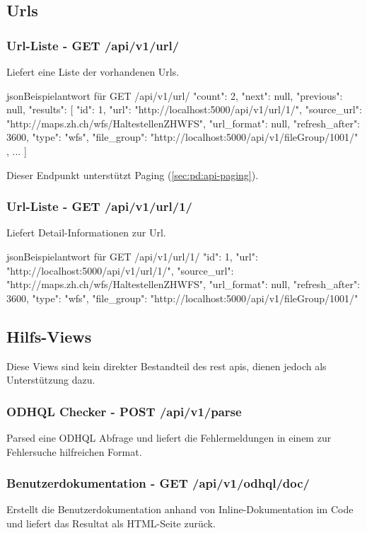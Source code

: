 \subsection{Urls} \label{sec:pd:api-urls}
\subsubsection{Url-Liste - GET /api/v1/url/}
Liefert eine Liste der vorhandenen Urls.

\begin{srclst}{json}{Beispielantwort für GET /api/v1/url/}
{
    "count": 2, 
    "next": null, 
    "previous": null, 
    "results": [
        {
            "id": 1, 
            "url": "http://localhost:5000/api/v1/url/1/", 
            "source_url": "http://maps.zh.ch/wfs/HaltestellenZHWFS", 
            "url_format": null, 
            "refresh_after": 3600, 
            "type": "wfs", 
            "file_group": "http://localhost:5000/api/v1/fileGroup/1001/"
        }, 
        ...
    ]
}
\end{srclst}

Dieser Endpunkt unterstützt Paging (\cref{sec:pd:api-paging}).

\subsubsection{Url-Liste - GET /api/v1/url/1/}
Liefert Detail-Informationen zur Url.

\begin{srclst}{json}{Beispielantwort für GET /api/v1/url/1/}
{
    "id": 1, 
    "url": "http://localhost:5000/api/v1/url/1/", 
    "source_url": "http://maps.zh.ch/wfs/HaltestellenZHWFS", 
    "url_format": null, 
    "refresh_after": 3600, 
    "type": "wfs", 
    "file_group": "http://localhost:5000/api/v1/fileGroup/1001/"
}
\end{srclst}

\subsection{Hilfs-Views}
Diese Views sind kein direkter Bestandteil des \gls{rest} \acs{api}s, dienen jedoch als Unterstützung dazu.

\subsubsection{ODHQL Checker - POST /api/v1/parse} \label{sec:pd:api-parse}
Parsed eine ODHQL Abfrage und liefert die Fehlermeldungen in einem zur Fehlersuche hilfreichen Format.

\subsubsection{Benutzerdokumentation - GET /api/v1/odhql/doc/}
Erstellt die Benutzerdokumentation anhand von Inline-Dokumentation im Code und liefert das Resultat als HTML-Seite zurück.